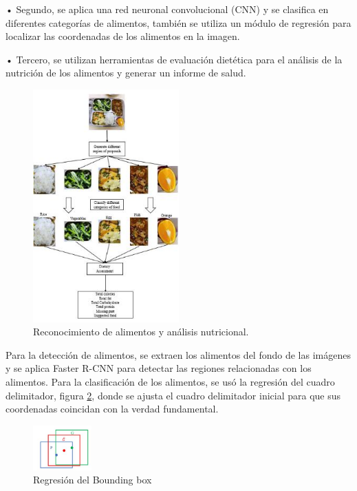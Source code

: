 • Segundo, se aplica una red neuronal convolucional (CNN) y se clasifica en diferentes categorías de alimentos, también se utiliza un módulo de regresión para localizar las coordenadas de los alimentos en la imagen.

• Tercero, se utilizan herramientas de evaluación dietética para el análisis de la nutrición de los alimentos y generar un informe de salud.

\begin{figure}[h]
		\begin{center}
			\includegraphics[width=0.5\textwidth]{2/imagen2/9FIGURA9PAPER3.JPG}
	        \caption{Reconocimiento de alimentos y análisis nutricional.}
			\label{fig9}
		\end{center}
		
	\end{figure}

\thinspace
Para la detección de alimentos, se extraen los alimentos del fondo de las imágenes y se aplica Faster R-CNN para detectar las regiones relacionadas con los alimentos. 
Para la clasificación de los alimentos, se usó la regresión del cuadro delimitador, figura \ref{fig10},  donde se ajusta el cuadro delimitador inicial para que sus coordenadas coincidan con la verdad fundamental.

\begin{figure}[h]
		\begin{center}
			\includegraphics[width=0.2\textwidth]{2/imagen2/10FIGURA10PAPER3.JPG}
	        \caption{Regresión del Bounding box}
			\label{fig10}
		\end{center}
		
	\end{figure}


